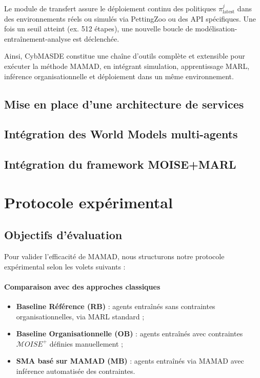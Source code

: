 Le module de transfert assure le déploiement continu des politiques $\pi^j_{\text{latest}}$ dans des environnements réels ou simulés via PettingZoo ou des API spécifiques. Une fois un seuil atteint (ex. 512 étapes), une nouvelle boucle de modélisation-entraînement-analyse est déclenchée.

Ainsi, \ac{CybMASDE} constitue une chaîne d'outils complète et extensible pour exécuter la méthode \ac{MAMAD}, en intégrant simulation, apprentissage \ac{MARL}, inférence organisationnelle et déploiement dans un même environnement.


\section{Mise en place d'une architecture de services}
\section{Intégration des World Models multi-agents}
\section{Intégration du framework MOISE+MARL}


\chapter{Protocole expérimental}

\section{Objectifs d'évaluation}

Pour valider l'efficacité de \ac{MAMAD}, nous structurons notre protocole expérimental selon les volets suivants :

\subsubsection{Comparaison avec des approches classiques}

\begin{itemize}
    \item \textbf{Baseline Référence (RB)} : agents entraînés sans contraintes organisationnelles, via \ac{MARL} standard ;
    \item \textbf{Baseline Organisationnelle (OB)} : agents entraînés avec contraintes $\mathcal{M}OISE^+$ définies manuellement ;
    \item \textbf{\ac{SMA} basé sur \ac{MAMAD} (MB)} : agents entraînés via \ac{MAMAD} avec inférence automatisée des contraintes.
\end{itemize}

